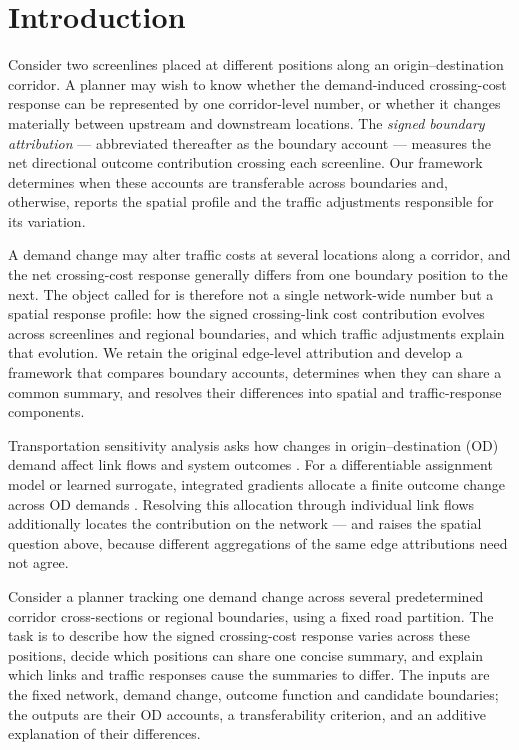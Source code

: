 \documentclass[a4paper,fleqn]{cas-sc}
\begin{document}
\section{Introduction}\label{sec:intro}
Consider two screenlines placed at different positions along an
origin--destination corridor. A planner may wish to know whether the
demand-induced crossing-cost response can be represented by one
corridor-level number, or whether it changes materially between
upstream and downstream locations. The \emph{signed boundary
attribution} --- abbreviated thereafter as the boundary account ---
measures the net directional outcome contribution crossing each
screenline. Our framework determines when these accounts are
transferable across boundaries and, otherwise, reports the spatial
profile and the traffic adjustments responsible for its variation.

A demand change may alter traffic costs at several locations along a
corridor, and the net crossing-cost response generally differs from one
boundary position to the next. The object called for is therefore not a
single network-wide number but a spatial response profile: how the
signed crossing-link cost contribution evolves across screenlines and
regional boundaries, and which traffic adjustments explain that
evolution. We retain the original edge-level attribution and develop a
framework that compares boundary accounts, determines when they can
share a common summary, and resolves their differences into spatial and
traffic-response components.

Transportation sensitivity analysis asks how changes in origin--destination
(OD) demand affect link flows and system outcomes
\citep{tobin1988sensitivity,josefsson2007sensitivity,patriksson2003aggregated}.
For a differentiable assignment model or learned surrogate, integrated
gradients allocate a finite outcome change across OD demands
\citep{sundararajan2017axiomatic}. Resolving this allocation through
individual link flows additionally locates the contribution on the
network --- and raises the spatial question above, because different
aggregations of the same edge attributions need not agree.

Consider a planner tracking one demand change across several
predetermined corridor cross-sections or regional boundaries, using a
fixed road partition. The task is to describe how the signed
crossing-cost response varies across these positions, decide which
positions can share one concise summary, and explain which links and
traffic responses cause the summaries to differ. The inputs are the
fixed network, demand change, outcome function and candidate
boundaries; the outputs are their OD accounts, a transferability
criterion, and an additive explanation of their differences.
\end{document}
